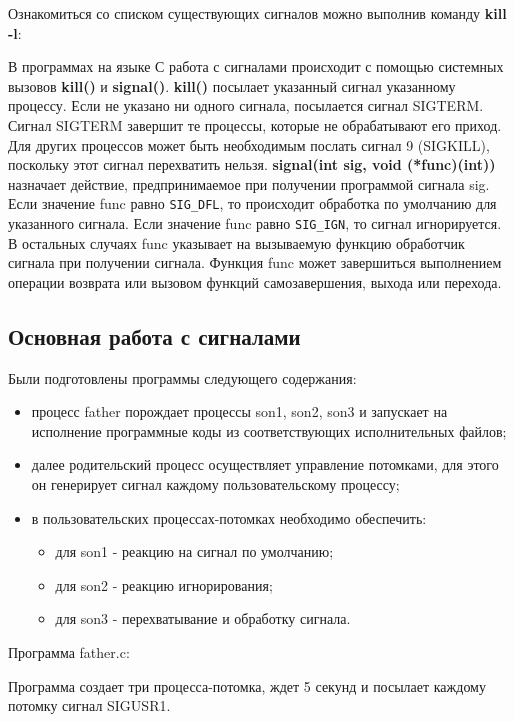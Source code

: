 \documentclass[a4paper]{article}
\begin{document}
	Ознакомиться со списком существующих сигналов можно выполнив команду \textbf{kill -l}:
	
	
	В программах на языке С работа с сигналами происходит с помощью системных вызовов \textbf{kill()} и \textbf{signal()}. \textbf{kill()} посылает указанный сигнал указанному процессу. Если не указано ни одного сигнала, посылается сигнал SIGTERM. Сигнал SIGTERM завершит те процессы, которые не обрабатывают его приход. Для других процессов может быть необходимым послать сигнал 9 (SIGKILL), поскольку этот сигнал перехватить нельзя. \textbf{signal(int sig, void (*func)(int))} назначает действие, предпринимаемое при получении программой сигнала sig. Если значение func равно \texttt{SIG\_DFL}, то происходит обработка по умолчанию для указанного сигнала. Если значение func равно \texttt{SIG\_IGN}, то сигнал игнорируется. В остальных случаях func указывает на вызываемую функцию обработчик сигнала при получении сигнала. Функция func может завершиться выполнением операции возврата или вызовом функций самозавершения, выхода или перехода.
	\subsection{Основная работа с сигналами}	
	Были подготовлены программы следующего содержания: 
	\begin{itemize}
		\item процесс father порождает процессы son1, son2, son3 и запускает на исполнение программные коды из соответствующих исполнительных файлов; 
		\item далее родительский процесс осуществляет управление потомками, для этого он генерирует сигнал каждому пользовательскому процессу; 
		\item в пользовательских процессах-потомках необходимо обеспечить:
			\begin{itemize}
				\item для son1 - реакцию на сигнал по умолчанию; 
				\item для son2 - реакцию игнорирования; 
				\item для son3 - перехватывание и обработку сигнала.		
			\end{itemize}	
	\end{itemize} 
	
	Программа father.c:
	
	
	Программа создает три процесса-потомка, ждет 5 секунд и посылает каждому потомку сигнал SIGUSR1.
	
\end{document}
